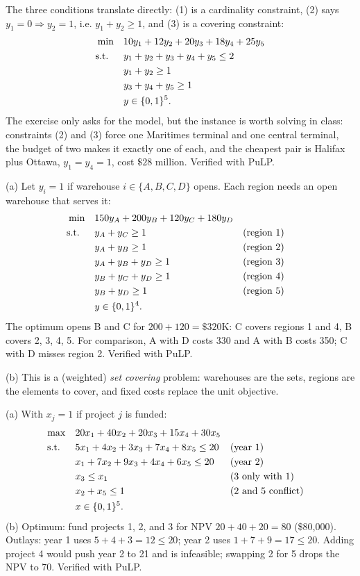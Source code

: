 The three conditions translate directly: (1) is a cardinality constraint, (2) says $y_1 = 0 \Rightarrow y_2 = 1$, i.e. $y_1 + y_2 \geq 1$, and (3) is a covering constraint:
\[
\begin{aligned}
\min\quad & 10y_1 + 12y_2 + 20y_3 + 18y_4 + 25y_5\\
\text{s.t.}\;\;\quad & y_1 + y_2 + y_3 + y_4 + y_5 \leq 2\\
& y_1 + y_2 \geq 1\\
& y_3 + y_4 + y_5 \geq 1\\
& y \in \{0,1\}^5.
\end{aligned}
\]
The exercise only asks for the model, but the instance is worth solving in class: constraints (2) and (3) force one Maritimes terminal and one central terminal, the budget of two makes it exactly one of each, and the cheapest pair is Halifax plus Ottawa, $y_1 = y_4 = 1$, cost $\$28$ million. Verified with PuLP.


(a) Let $y_i = 1$ if warehouse $i \in \{A, B, C, D\}$ opens. Each region needs an open warehouse that serves it:
\[
\begin{aligned}
\min\quad & 150y_A + 200y_B + 120y_C + 180y_D\\
\text{s.t.}\;\;\quad & y_A + y_C \geq 1 && \text{(region 1)}\\
& y_A + y_B \geq 1 && \text{(region 2)}\\
& y_A + y_B + y_D \geq 1 && \text{(region 3)}\\
& y_B + y_C + y_D \geq 1 && \text{(region 4)}\\
& y_B + y_D \geq 1 && \text{(region 5)}\\
& y \in \{0,1\}^4.
\end{aligned}
\]
The optimum opens B and C for $200 + 120 = \$320$K: C covers regions 1 and 4, B covers 2, 3, 4, 5. For comparison, A with D costs 330 and A with B costs 350; C with D misses region 2. Verified with PuLP.

(b) This is a (weighted) \emph{set covering} problem: warehouses are the sets, regions are the elements to cover, and fixed costs replace the unit objective.


(a) With $x_j = 1$ if project $j$ is funded:
\[
\begin{aligned}
\max\quad & 20x_1 + 40x_2 + 20x_3 + 15x_4 + 30x_5\\
\text{s.t.}\;\;\quad & 5x_1 + 4x_2 + 3x_3 + 7x_4 + 8x_5 \leq 20 && \text{(year 1)}\\
& x_1 + 7x_2 + 9x_3 + 4x_4 + 6x_5 \leq 20 && \text{(year 2)}\\
& x_3 \leq x_1 && \text{(3 only with 1)}\\
& x_2 + x_5 \leq 1 && \text{(2 and 5 conflict)}\\
& x \in \{0,1\}^5.
\end{aligned}
\]
(b) Optimum: fund projects 1, 2, and 3 for NPV $20 + 40 + 20 = 80$ (\$80{,}000). Outlays: year 1 uses $5+4+3 = 12 \leq 20$; year 2 uses $1+7+9 = 17 \leq 20$. Adding project 4 would push year 2 to 21 and is infeasible; swapping 2 for 5 drops the NPV to 70. Verified with PuLP.

